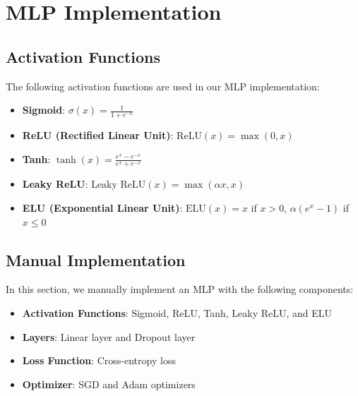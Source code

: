 \documentclass[a4paper,12pt]{article}
\begin{document}
\section{MLP Implementation}

\subsection{Activation Functions}
The following activation functions are used in our MLP implementation:

\begin{itemize}
    \item \textbf{Sigmoid}: \( \sigma(x) = \frac{1}{1 + e^{-x}} \)
    \item \textbf{ReLU (Rectified Linear Unit)}: \( \text{ReLU}(x) = \max(0, x) \)
    \item \textbf{Tanh}: \( \tanh(x) = \frac{e^x - e^{-x}}{e^x + e^{-x}} \)
    \item \textbf{Leaky ReLU}: \( \text{Leaky ReLU}(x) = \max(\alpha x, x) \)
    \item \textbf{ELU (Exponential Linear Unit)}: \( \text{ELU}(x) = x \) if \( x > 0 \), \( \alpha (e^x - 1) \) if \( x \leq 0 \)
\end{itemize}

\subsection{Manual Implementation}
In this section, we manually implement an MLP with the following components:

\begin{itemize}
    \item \textbf{Activation Functions}: Sigmoid, ReLU, Tanh, Leaky ReLU, and ELU
    \item \textbf{Layers}: Linear layer and Dropout layer
    \item \textbf{Loss Function}: Cross-entropy loss
    \item \textbf{Optimizer}: SGD and Adam optimizers
\end{itemize}
\end{document}
